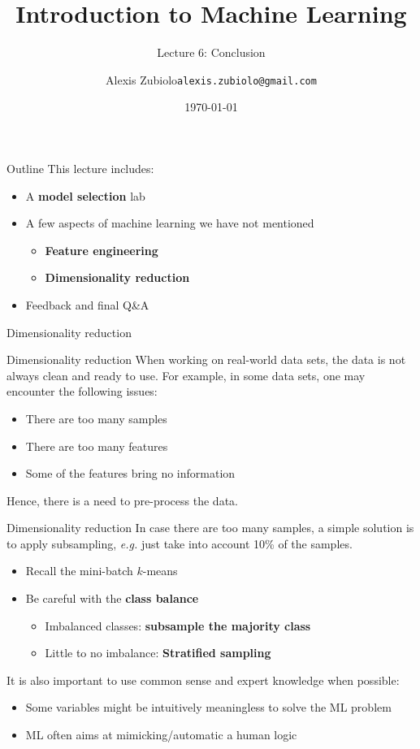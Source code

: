 \documentclass{beamer}
\title[Classification]{Introduction to Machine Learning}
\subtitle{Lecture 6: Conclusion}
\author{Alexis Zubiolo\newline\texttt{alexis.zubiolo@gmail.com}}
\institute{Data Science Team Lead @ Adcash}
\date{\today}
\newcommand{\1}[1]{\mathbbm{1}\left[#1\right]}
\begin{document}
\begin{frame}
  \titlepage
\end{frame}

\begin{frame}{Outline}
This lecture includes:
\begin{itemize}
 \item A \textbf{model selection} lab
 \item A few aspects of machine learning we have not mentioned
 \begin{itemize}
 	\item \textbf{Feature engineering}
 	\item \textbf{Dimensionality reduction}
 \end{itemize}
 \item Feedback and final Q\&A
\end{itemize}
\end{frame}


\begin{frame}
\begin{center}
\Huge{Dimensionality reduction}
\end{center}
\end{frame}

\begin{frame}{Dimensionality reduction}
When working on real-world data sets, the data is not always clean and ready to use.
\vfill
\pause
For example, in some data sets, one may encounter the following issues:
\begin{itemize}
	\item There are too many samples
	\item There are too many features
	\item Some of the features bring no information
\end{itemize}
\vfill
\pause
Hence, there is a need to pre-process the data.
\end{frame}

\begin{frame}{Dimensionality reduction}
In case there are too many samples, a simple solution is to apply subsampling, \textit{e.g.} just take into account 10\% of the samples.
\begin{itemize}
	\item Recall the mini-batch $k$-means
	\item Be careful with the \textbf{class balance}
	\begin{itemize}
		\item Imbalanced classes: \textbf{subsample the majority class}
		\item Little to no imbalance: \textbf{Stratified sampling}
	\end{itemize}
\end{itemize}
\vfill
\pause
It is also important to use common sense and expert knowledge when possible:
\begin{itemize}
	\item Some variables might be intuitively meaningless to solve the ML problem
	\item ML often aims at mimicking/automatic a human logic
\end{itemize}
\end{frame}
\end{document}
